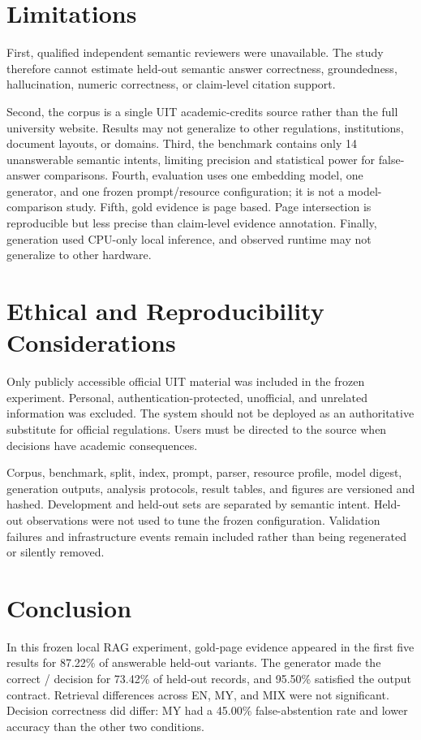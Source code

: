 \documentclass[a4paper,conference]{IEEEtran}
\newcommand{\code}[1]{\texttt{\detokenize{#1}}}
\begin{document}
\section{Limitations}
\label{sec:limitations}
First, qualified independent semantic reviewers were unavailable. The study therefore cannot estimate held-out semantic answer correctness, groundedness, hallucination, numeric correctness, or claim-level citation support.

Second, the corpus is a single UIT academic-credits source rather than the full university website. Results may not generalize to other regulations, institutions, document layouts, or domains. Third, the benchmark contains only 14 unanswerable semantic intents, limiting precision and statistical power for false-answer comparisons. Fourth, evaluation uses one embedding model, one generator, and one frozen prompt/resource configuration; it is not a model-comparison study. Fifth, gold evidence is page based. Page intersection is reproducible but less precise than claim-level evidence annotation. Finally, generation used CPU-only local inference, and observed runtime may not generalize to other hardware.

\section{Ethical and Reproducibility Considerations}
Only publicly accessible official UIT material was included in the frozen experiment. Personal, authentication-protected, unofficial, and unrelated information was excluded. The system should not be deployed as an authoritative substitute for official regulations. Users must be directed to the source when decisions have academic consequences.

Corpus, benchmark, split, index, prompt, parser, resource profile, model digest, generation outputs, analysis protocols, result tables, and figures are versioned and hashed. Development and held-out sets are separated by semantic intent. Held-out observations were not used to tune the frozen configuration. Validation failures and infrastructure events remain included rather than being regenerated or silently removed.

\section{Conclusion}
In this frozen local RAG experiment, gold-page evidence appeared in the first five results for 87.22\% of answerable held-out variants. The generator made the correct \code{ANSWER}/\code{ABSTAIN} decision for 73.42\% of held-out records, and 95.50\% satisfied the output contract. Retrieval differences across EN, MY, and MIX were not significant. Decision correctness did differ: MY had a 45.00\% false-abstention rate and lower accuracy than the other two conditions.
\end{document}
